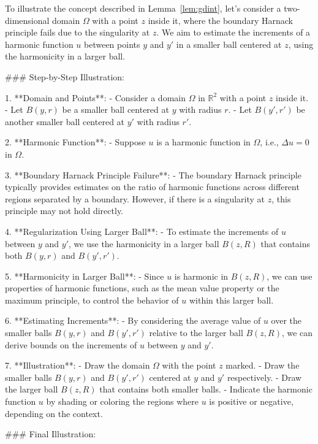 To illustrate the concept described in Lemma~\ref{lem:gdint}, let's consider a two-dimensional domain \(\Omega\) with a point \(z\) inside it, where the boundary Harnack principle fails due to the singularity at \(z\). We aim to estimate the increments of a harmonic function \(u\) between points \(y\) and \(y'\) in a smaller ball centered at \(z\), using the harmonicity in a larger ball.

### Step-by-Step Illustration:

1. **Domain and Points**:
   - Consider a domain \(\Omega\) in \(\mathbb{R}^2\) with a point \(z\) inside it.
   - Let \(B(y, r)\) be a smaller ball centered at \(y\) with radius \(r\).
   - Let \(B(y', r')\) be another smaller ball centered at \(y'\) with radius \(r'\).

2. **Harmonic Function**:
   - Suppose \(u\) is a harmonic function in \(\Omega\), i.e., \(\Delta u = 0\) in \(\Omega\).

3. **Boundary Harnack Principle Failure**:
   - The boundary Harnack principle typically provides estimates on the ratio of harmonic functions across different regions separated by a boundary. However, if there is a singularity at \(z\), this principle may not hold directly.

4. **Regularization Using Larger Ball**:
   - To estimate the increments of \(u\) between \(y\) and \(y'\), we use the harmonicity in a larger ball \(B(z, R)\) that contains both \(B(y, r)\) and \(B(y', r')\).

5. **Harmonicity in Larger Ball**:
   - Since \(u\) is harmonic in \(B(z, R)\), we can use properties of harmonic functions, such as the mean value property or the maximum principle, to control the behavior of \(u\) within this larger ball.

6. **Estimating Increments**:
   - By considering the average value of \(u\) over the smaller balls \(B(y, r)\) and \(B(y', r')\) relative to the larger ball \(B(z, R)\), we can derive bounds on the increments of \(u\) between \(y\) and \(y'\).

7. **Illustration**:
   - Draw the domain \(\Omega\) with the point \(z\) marked.
   - Draw the smaller balls \(B(y, r)\) and \(B(y', r')\) centered at \(y\) and \(y'\) respectively.
   - Draw the larger ball \(B(z, R)\) that contains both smaller balls.
   - Indicate the harmonic function \(u\) by shading or coloring the regions where \(u\) is positive or negative, depending on the context.

### Final Illustration:

